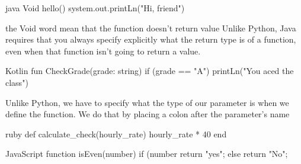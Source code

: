 java 
  Void hello() {
    system.out.printLn("Hi, friend")
  }

the Void word mean that the function doesn't return value 
Unlike Python, Java requires that you always specify explicitly what the return type is of a function, even when that function isn't going to return a value.

Kotlin 
  fun CheckGrade(grade: string){
    if (grade == "A")
      printLn("You aced the class")
  }

Unlike Python, we have to specify what the type of our parameter is when we define the function. We do that by placing a colon after the parameter's name



ruby
  def calculate_check(hourly_rate)
    hourly_rate * 40
  end


JavaScript 
  function isEven(number) {
    if (number %
      return "yes";
    else 
      return "No";
  }